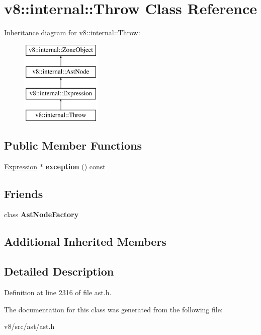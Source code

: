\hypertarget{classv8_1_1internal_1_1Throw}{}\section{v8\+:\+:internal\+:\+:Throw Class Reference}
\label{classv8_1_1internal_1_1Throw}
Inheritance diagram for v8\+:\+:internal\+:\+:Throw\+:\begin{figure}[H]
\begin{center}
\leavevmode
\includegraphics[height=4.000000cm]{classv8_1_1internal_1_1Throw}
\end{center}
\end{figure}
\subsection*{Public Member Functions}
\begin{DoxyCompactItemize}
\item 
\mbox{\label{classv8_1_1internal_1_1Throw_a85ee742325d2e74a099242d3c4a47ed1}} 
\mbox{\hyperlink{classv8_1_1internal_1_1Expression}{Expression}} $\ast$ {\bfseries exception} () const
\end{DoxyCompactItemize}
\subsection*{Friends}
\begin{DoxyCompactItemize}
\item 
\mbox{\label{classv8_1_1internal_1_1Throw_a8d587c8ad3515ff6433eb83c578e795f}} 
class {\bfseries Ast\+Node\+Factory}
\end{DoxyCompactItemize}
\subsection*{Additional Inherited Members}


\subsection{Detailed Description}


Definition at line 2316 of file ast.\+h.



The documentation for this class was generated from the following file\+:\begin{DoxyCompactItemize}
\item 
v8/src/ast/ast.\+h\end{DoxyCompactItemize}
